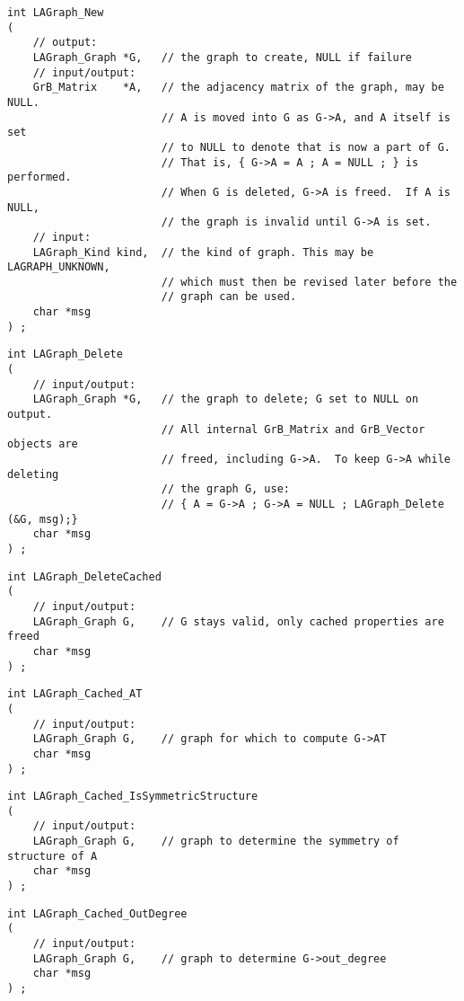\begin{verbatim}
int LAGraph_New
(
    // output:
    LAGraph_Graph *G,   // the graph to create, NULL if failure
    // input/output:
    GrB_Matrix    *A,   // the adjacency matrix of the graph, may be NULL.
                        // A is moved into G as G->A, and A itself is set
                        // to NULL to denote that is now a part of G.
                        // That is, { G->A = A ; A = NULL ; } is performed.
                        // When G is deleted, G->A is freed.  If A is NULL,
                        // the graph is invalid until G->A is set.
    // input:
    LAGraph_Kind kind,  // the kind of graph. This may be LAGRAPH_UNKNOWN,
                        // which must then be revised later before the
                        // graph can be used.
    char *msg
) ;
\end{verbatim}




\begin{verbatim}
int LAGraph_Delete
(
    // input/output:
    LAGraph_Graph *G,   // the graph to delete; G set to NULL on output.
                        // All internal GrB_Matrix and GrB_Vector objects are
                        // freed, including G->A.  To keep G->A while deleting
                        // the graph G, use:
                        // { A = G->A ; G->A = NULL ; LAGraph_Delete (&G, msg);}
    char *msg
) ;
\end{verbatim}




\begin{verbatim}
int LAGraph_DeleteCached
(
    // input/output:
    LAGraph_Graph G,    // G stays valid, only cached properties are freed
    char *msg
) ;
\end{verbatim}




\begin{verbatim}
int LAGraph_Cached_AT
(
    // input/output:
    LAGraph_Graph G,    // graph for which to compute G->AT
    char *msg
) ;
\end{verbatim}




\begin{verbatim}
int LAGraph_Cached_IsSymmetricStructure
(
    // input/output:
    LAGraph_Graph G,    // graph to determine the symmetry of structure of A
    char *msg
) ;
\end{verbatim}




\begin{verbatim}
int LAGraph_Cached_OutDegree
(
    // input/output:
    LAGraph_Graph G,    // graph to determine G->out_degree
    char *msg
) ;
\end{verbatim}




